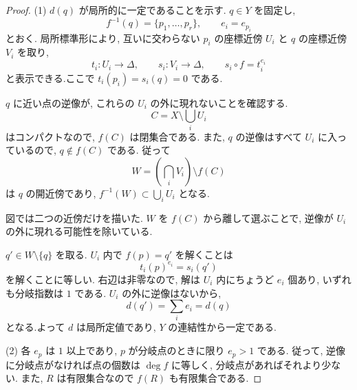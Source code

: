 \documentclass[dvipdfmx,a4paper,11pt]{article} %
\theoremstyle{definition}
\numberwithin{equation}{section}
\begin{document}
\begin{proof}
(1) $d(q)$ が局所的に一定であることを示す.
$q\in Y$ を固定し, 
\[
f^{-1}(q)=\{p_1,\ldots,p_r\},\qquad e_i=e_{p_i}
\]
とおく.
局所標準形により, 互いに交わらない $p_i$ の座標近傍 $U_i$ と
$q$ の座標近傍 $V_i$ を取り, 
\[
t_i:U_i\to\Delta,\qquad s_i:V_i\to\Delta,\qquad
s_i\circ f=t_i^{e_i}
\]
と表示できる.ここで $t_i(p_i)=s_i(q)=0$ である.

$q$ に近い点の逆像が, これらの $U_i$ の外に現れないことを確認する.
\[
C=X\setminus\bigcup_i U_i
\]
はコンパクトなので, $f(C)$ は閉集合である.
また, $q$ の逆像はすべて $U_i$ に入っているので, $q\notin f(C)$ である.
従って
\[
W=\left(\bigcap_i V_i\right)\setminus f(C)
\]
は $q$ の開近傍であり, $f^{-1}(W)\subset\bigcup_i U_i$ となる.
\begin{center}
\end{center}
図では二つの近傍だけを描いた.
$W$ を $f(C)$ から離して選ぶことで, 逆像が $U_i$ の外に現れる可能性を除いている.

$q'\in W\setminus\{q\}$ を取る.
$U_i$ 内で $f(p)=q'$ を解くことは
\[
t_i(p)^{e_i}=s_i(q')
\]
を解くことに等しい.
右辺は非零なので, 解は $U_i$ 内にちょうど $e_i$ 個あり, 
いずれも分岐指数は $1$ である.
$U_i$ の外に逆像はないから, 
\[
d(q')=\sum_i e_i=d(q)
\]
となる.よって $d$ は局所定値であり, $Y$ の連結性から一定である.

(2) 各 $e_p$ は $1$ 以上であり, $p$ が分岐点のときに限り $e_p>1$ である.
従って, 逆像に分岐点がなければ点の個数は $\deg f$ に等しく, 
分岐点があればそれより少ない.
また, $R$ は有限集合なので $f(R)$ も有限集合である.
\end{proof}
\end{document}
